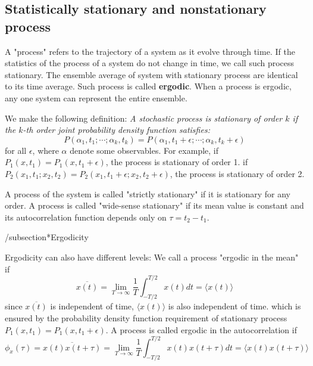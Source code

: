 \documentclass{article}
\begin{document}
\subsection*{Statistically stationary and nonstationary process}
A "process" refers to the trajectory of a system as it evolve through time. If the 
statistics of the process of a system do not change in time, we call such 
process stationary. The ensemble average of system with stationary process 
are identical to its time average. Such process is called \textbf{ergodic}.
When a process is ergodic, any one system can represent the entire ensemble. 

We make the following definition:
\emph{A stochastic process is stationary of order $k$ if the $k$-th order 
joint probability density function satisfies:}
\begin{equation}
    P(\alpha_1,t_1; \cdots; \alpha_k, t_k) = P(\alpha_1,t_1+\epsilon; \cdots; \alpha_k, t_k+\epsilon)
\end{equation}
for all $\epsilon$, where $\alpha$ denote some observables.
For example, if $P_1(x,t_1) = P_1(x,t_1+\epsilon)$, the process is stationary of order 1.
if $P_2(x_1,t_1;x_2,t_2) = P_2(x_1,t_1+\epsilon;x_2,t_2+\epsilon)$, 
the process is stationary of order 2.

A process of the system is called "strictly stationary" if it is stationary for any order.
A process is called "wide-sense stationary" if its mean value is constant and its 
autocorrelation function depends only on $\tau = t_2 - t_1$. 

/subsection*{Ergodicity}

Ergodicity can also have different levels: We call a process "ergodic in the mean" if
\begin{equation}
    \overline{x(t)} = \lim_{T\to\infty} \frac{1}{T} \int_{-T/2}^{T/2} x(t) dt
     = \langle x(t) \rangle
\end{equation}
since $\overline{x(t)}$ is independent of time, $\langle x(t) \rangle$ is also independent of time.
which is ensured by the probability density function requirement of stationary process
$P_1(x,t_1) = P_1(x,t_1+\epsilon)$. 
A process is called ergodic in the autocorrelation if 
\begin{equation}
    \phi_x(\tau) = \overline{x(t)x(t+\tau)} 
    = \lim_{T\to\infty} \frac{1}{T} \int_{-T/2}^{T/2} x(t) x(t+\tau) dt
     = \langle x(t)x(t+\tau) \rangle \label{autocorrelation_requirement}
\end{equation}
\end{document}
